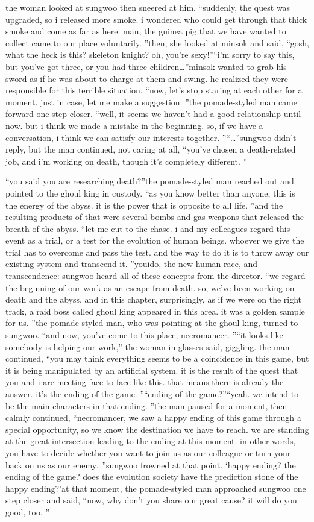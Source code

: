 the woman looked at sungwoo then sneered at him.
“suddenly, the quest was upgraded, so i released more smoke.
 i wondered who could get through that thick smoke and come as far as here.
 man, the guinea pig that we have wanted to collect came to our place voluntarily.
”then, she looked at minsok and said, “gosh, what the heck is this? skeleton knight? oh, you’re sexy!”“i’m sorry to say this, but you’ve got three, or you had three children…”minsok wanted to grab his sword as if he was about to charge at them and swing.
 he realized they were responsible for this terrible situation.
“now, let’s stop staring at each other for a moment.
 just in case, let me make a suggestion.
”the pomade-styled man came forward one step closer.
“well, it seems we haven’t had a good relationship until now.
 but i think we made a mistake in the beginning.
 so, if we have a conversation, i think we can satisfy our interests together.
”“…”sungwoo didn’t reply, but the man continued, not caring at all, “you’ve chosen a death-related job, and i’m working on death, though it’s completely different.
”

“you said you are researching death?”the pomade-styled man reached out and pointed to the ghoul king in custody.
“as you know better than anyone, this is the energy of the abyss.
 it is the power that is opposite to all life.
”and the resulting products of that were several bombs and gas weapons that released the breath of the abyss.
“let me cut to the chase.
 i and my colleagues regard this event as a trial, or a test for the evolution of human beings.
 whoever we give the trial has to overcome and pass the test.
 and the way to do it is to throw away our existing system and transcend it.
”youido, the new human race, and transcendence: sungwoo heard all of these concepts from the director.
“we regard the beginning of our work as an escape from death.
 so, we’ve been working on death and the abyss, and in this chapter, surprisingly, as if we were on the right track, a raid boss called ghoul king appeared in this area.
 it was a golden sample for us.
”the pomade-styled man, who was pointing at the ghoul king, turned to sungwoo.
“and now, you’ve come to this place, necromancer.
”“it looks like somebody is helping our work,” the woman in glasses said, giggling.
the man continued, “you may think everything seems to be a coincidence in this game, but it is being manipulated by an artificial system.
 it is the result of the quest that you and i are meeting face to face like this.
 that means there is already the answer.
 it’s the ending of the game.
”“ending of the game?”“yeah.
 we intend to be the main characters in that ending.
”the man paused for a moment, then calmly continued, “necromancer, we saw a happy ending of this game through a special opportunity, so we know the destination we have to reach.
 we are standing at the great intersection leading to the ending at this moment.
 in other words, you have to decide whether you want to join us as our colleague or turn your back on us as our enemy…”sungwoo frowned at that point.
‘happy ending? the ending of the game? does the evolution society have the prediction stone of the happy ending?’at that moment, the pomade-styled man approached sungwoo one step closer and said, “now, why don’t you share our great cause? it will do you good, too.
”

 